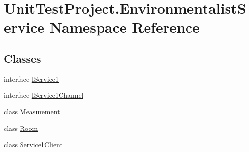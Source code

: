 \hypertarget{namespace_unit_test_project_1_1_environmentalist_service}{}\section{Unit\+Test\+Project.\+Environmentalist\+Service Namespace Reference}
\label{namespace_unit_test_project_1_1_environmentalist_service}
\subsection*{Classes}
\begin{DoxyCompactItemize}
\item 
interface \hyperlink{interface_unit_test_project_1_1_environmentalist_service_1_1_i_service1}{I\+Service1}
\item 
interface \hyperlink{interface_unit_test_project_1_1_environmentalist_service_1_1_i_service1_channel}{I\+Service1\+Channel}
\item 
class \hyperlink{class_unit_test_project_1_1_environmentalist_service_1_1_measurement}{Measurement}
\item 
class \hyperlink{class_unit_test_project_1_1_environmentalist_service_1_1_room}{Room}
\item 
class \hyperlink{class_unit_test_project_1_1_environmentalist_service_1_1_service1_client}{Service1\+Client}
\end{DoxyCompactItemize}

